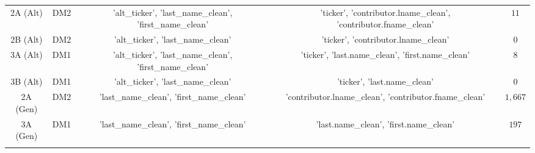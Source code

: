 \begin{table}[!htbp]
\begin{tabular}{@{\extracolsep{5pt}} ccccc}
2A (Alt) & DM2 & 'alt\_ticker', 'last\_name\_clean', 'first\_name\_clean' & 'ticker', 'contributor.lname\_clean', 'contributor.fname\_clean' & $11$ \\ 
2B (Alt) & DM2 & 'alt\_ticker', 'last\_name\_clean' & 'ticker', 'contributor.lname\_clean' & $0$ \\ 
3A (Alt) & DM1 & 'alt\_ticker', 'last\_name\_clean', 'first\_name\_clean' & 'ticker', 'last.name\_clean', 'first.name\_clean' & $8$ \\ 
3B (Alt) & DM1 & 'alt\_ticker', 'last\_name\_clean' & 'ticker', 'last.name\_clean' & $0$ \\ 
2A (Gen) & DM2 & 'last\_name\_clean', 'first\_name\_clean' & 'contributor.lname\_clean', 'contributor.fname\_clean' & $1,667$ \\ 
3A (Gen) & DM1 & 'last\_name\_clean', 'first\_name\_clean' & 'last.name\_clean', 'first.name\_clean' & $197$ \\ 
\hline \\[-1.8ex] 
\end{tabular} 
\end{table}  
